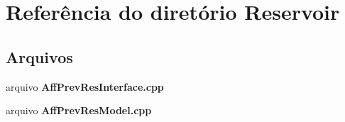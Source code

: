 \section{Referência do diretório Reservoir}
\label{dir_4f2437ee6570ca9677215eb43ac9bc04}
\subsection*{Arquivos}
\begin{DoxyCompactItemize}
\item 
arquivo {\bf Aff\+Prev\+Res\+Interface.\+cpp}
\item 
arquivo {\bf Aff\+Prev\+Res\+Model.\+cpp}
\end{DoxyCompactItemize}
